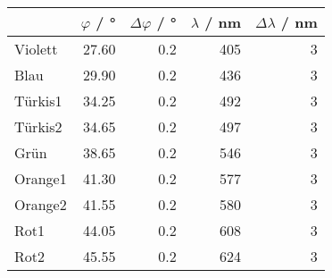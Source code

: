 \begin{tabular}{lrrrr}
	\toprule
	{}      & $\varphi$ / \si{\degree} & $\Delta \varphi$ / \si{\degree} & $\lambda$ / \si{\nm} & $\Delta \lambda$ / \si{\nm} \\
	\midrule
	Violett & 27.60                    & 0.2                             & 405                  & 3                           \\
	Blau    & 29.90                    & 0.2                             & 436                  & 3                           \\
	Türkis1 & 34.25                    & 0.2                             & 492                  & 3                           \\
	Türkis2 & 34.65                    & 0.2                             & 497                  & 3                           \\
	Grün    & 38.65                    & 0.2                             & 546                  & 3                           \\
	Orange1 & 41.30                    & 0.2                             & 577                  & 3                           \\
	Orange2 & 41.55                    & 0.2                             & 580                  & 3                           \\
	Rot1    & 44.05                    & 0.2                             & 608                  & 3                           \\
	Rot2    & 45.55                    & 0.2                             & 624                  & 3                           \\
	\bottomrule
\end{tabular}
